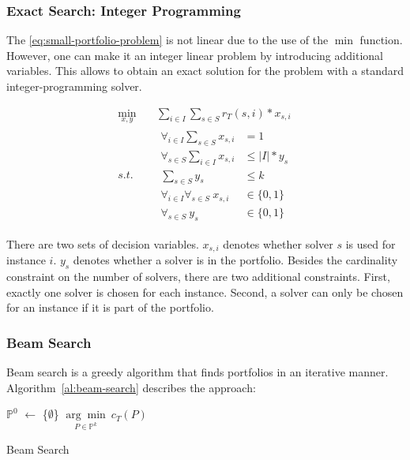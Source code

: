 \documentclass[conference]{IEEEtran}
\begin{document}
\subsubsection{Exact Search: Integer Programming}

The \ref{eq:small-portfolio-problem} is not linear due to the use of the $\min$ function.
However, one can make it an integer linear problem by introducing additional variables.
This allows to obtain an exact solution for the problem with a standard integer-programming solver.

\begin{equation}
	\label{eq:small-portfolio-integer-problem}
	\begin{aligned}
		\min_{x,y} \quad & \sum_{i \in I} \sum_{s \in S} r_T(s,i) * x_{s,i} \\
		s.t. \quad & \begin{aligned}
			\forall_{i\in I} \sum_{s \in S} x_{s,i} &= 1\\
			\forall_{s \in S} \sum_{i \in I} x_{s,i} &\leq |I| * y_s\\
			\sum_{s \in S} y_s &\leq k\\
			\forall_{i\in I} \forall_{s \in S}~x_{s,i} &\in \{0, 1\}\\
			\forall_{s \in S}~y_s &\in \{0,1\}
		\end{aligned}
	\end{aligned}
	\tag{Small-Portfolio Integer Problem}
\end{equation}

There are two sets of decision variables.
$x_{s,i}$ denotes whether solver $s$ is used for instance $i$.
$y_s$ denotes whether a solver is in the portfolio.
Besides the cardinality constraint on the number of solvers, there are two additional constraints.
First, exactly one solver is chosen for each instance.
Second, a solver can only be chosen for an instance if it is part of the portfolio.

\subsubsection{Beam Search}

Beam search is a greedy algorithm that finds portfolios in an iterative manner.
Algorithm~\ref{al:beam-search} describes the approach:

\begin{algorithm}[htb]
	$\mathbb{P}^0$ $\leftarrow$ \{$\emptyset$\}
	\Return $\underset{P \in \mathbb{P}^k}{\arg\min}~c_{T}(P)$\;
	\caption{Beam Search}
	\label{al:beam-search}
\end{algorithm}
\end{document}
